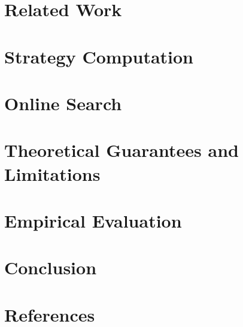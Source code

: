 \documentclass[preprint,12pt]{elsarticle}
\newcommand{\reviewchange}[1]{{\color{blue}#1}}
\begin{document}
 

\section{Related Work} \label{sec:relwork}



\section{Strategy Computation} \label{sec:offline}

 

\section{Online Search} \label{sec:online}



\reviewchange{
\section{Theoretical Guarantees and Limitations}

 \label{sec:theory}
}

\section{Empirical Evaluation} \label{sec:eval}



\section{Conclusion} \label{sec:conc}



\section*{References}










\end{document}
